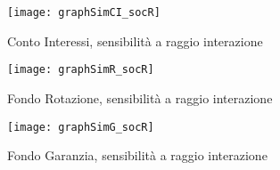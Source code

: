 \documentclass[12pt,a4paper,openright,twoside]{report}
\begin{document}
\begin{figure}[hbt]
	\centering
	\texttt{[image: graphSimCI\_socR]}
	\caption{Conto Interessi, sensibilità a raggio interazione}
	\label{graphCIsocR}
\end{figure}

\begin{figure}[H]
	\centering
	\texttt{[image: graphSimR\_socR]}
	\caption{Fondo Rotazione, sensibilità a raggio interazione}
	\label{graphRsocR}
\end{figure}

\begin{figure}[hbt]
	\centering
	\texttt{[image: graphSimG\_socR]}
	\caption{Fondo Garanzia, sensibilità a raggio interazione}
	\label{graphGsocR}
\end{figure}


\nocite{*}


\end{document}
